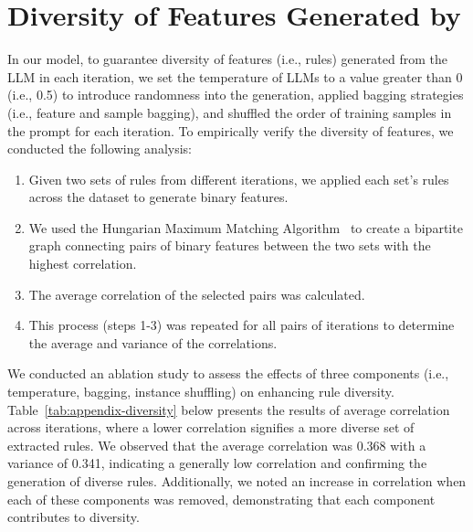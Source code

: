\documentclass{article}
\theoremstyle{plain}
\theoremstyle{definition}
\theoremstyle{remark}
\begin{document}
\section{Diversity of Features Generated by \model{}}
\label{sec:diversity}
In our model, to guarantee diversity of features (i.e., rules) generated from the LLM in each iteration, we set the temperature of LLMs to a value greater than 0 (i.e., 0.5) to introduce randomness into the generation, applied bagging strategies (i.e., feature and sample bagging), and shuffled the order of training samples in the prompt for each iteration. To empirically verify the diversity of features, we conducted the following analysis: \vspace{-3mm}
\begin{enumerate}[noitemsep]
    \item Given two sets of rules from different iterations, we applied each set's rules across the dataset to generate binary features. 
    \item We used the Hungarian Maximum Matching Algorithm~\cite{kuhn1955hungarian} to create a bipartite graph connecting pairs of binary features between the two sets with the highest correlation.
    \item The average correlation of the selected pairs was calculated.
    \item This process (steps 1-3) was repeated for all pairs of iterations to determine the average and variance of the correlations. \vspace{-3mm}
\end{enumerate}
We conducted an ablation study to assess the effects of three components (i.e., temperature, bagging, instance shuffling) on enhancing rule diversity. Table~\ref{tab:appendix-diversity} below presents the results of average correlation across iterations, where a lower correlation signifies a more diverse set of extracted rules. We observed that the average correlation was 0.368 with a variance of 0.341, indicating a generally low correlation and confirming the generation of diverse rules. Additionally, we noted an increase in correlation when each of these components was removed, demonstrating that each component contributes to diversity. 


\begin{table}[!ht]
\centering
\caption{Ablation study summaries on rule diversity.}
\label{tab:appendix-diversity}
\end{table}
\end{document}
